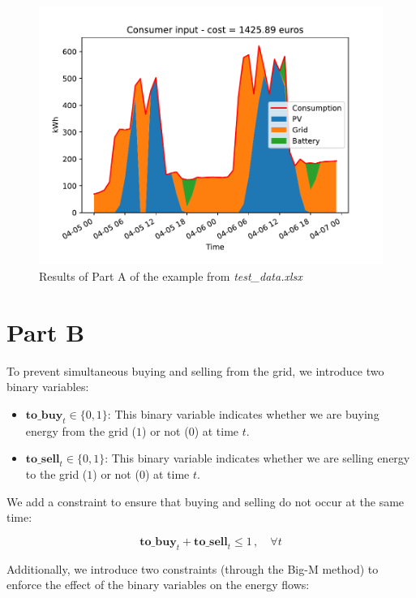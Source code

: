 \documentclass[12pt]{article}
\begin{document}
\begin{figure}
\includegraphics[width = \textwidth]{consumer_input}
\caption{Results of Part A of the example from \textit{test\_data.xlsx}}
\label{fig:resultsPartA}
\end{figure}

\section{Part B}

To prevent simultaneous buying and selling from the grid, we introduce two binary variables:

\begin{itemize}
\item $\mathbf{to\_buy}_t \in \{0, 1\}$: This binary variable indicates whether we are buying energy from the grid ($1$) or not ($0$) at time $t$.
\item $\mathbf{to\_sell}_t \in \{0, 1\}$: This binary variable indicates whether we are selling energy to the grid ($1$) or not ($0$) at time $t$.
\end{itemize}

We add a constraint to ensure that buying and selling do not occur at the same time:

\begin{equation}
\mathbf{to\_buy}_t + \mathbf{to\_sell}_t \leq 1 \, , \quad \forall t
\end{equation}

Additionally, we introduce two constraints (through the Big-M method) to enforce the effect of the binary variables on the energy flows:
\end{document}
